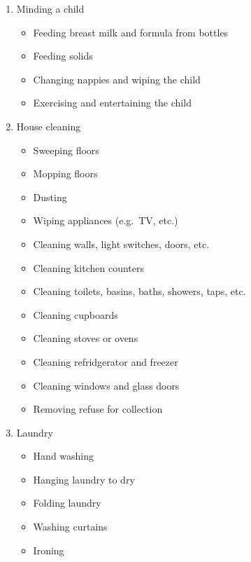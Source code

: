 \documentclass[a4paper,11pt]{article}
\begin{document}
\begin{multicols}{2}
  \raggedcolumns
  \raggedright
  \begin{enumerate}
    \item Minding a child
      \begin{itemize}
        \item Feeding breast milk and formula from bottles
        \item Feeding solids
        \item Changing nappies and wiping the child
        \item Exercising and entertaining the child
      \end{itemize}
    \item House cleaning
      \begin{itemize}
        \item Sweeping floors
        \item Mopping floors
        \item Dusting
        \item Wiping appliances (e.g.\ TV, etc.)
        \item Cleaning walls, light switches, doors, etc.
        \item Cleaning kitchen counters
        \item Cleaning toilets, basins, baths, showers, taps, etc.
        \item Cleaning cupboards
        \item Cleaning stoves or ovens
        \item Cleaning refridgerator and freezer
        \item Cleaning windows and glass doors
        \item Removing refuse for collection
      \end{itemize}
    \item Laundry
      \begin{itemize}
        \item Hand washing
        \item Hanging laundry to dry
        \item Folding laundry
        \item Washing curtains
        \item Ironing
      \end{itemize}
  \end{enumerate}
\end{multicols}
\end{document}

